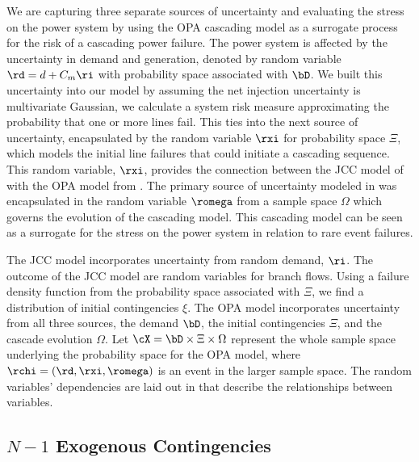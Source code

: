 We are capturing three separate sources of uncertainty and evaluating the stress on the power system by using the OPA cascading model as a surrogate process for the risk of a cascading power failure.  The power system is affected by the uncertainty in demand and generation, denoted by random variable $\rd = d + C_m \ri$ with  probability space associated with $\bD$.  We built this uncertainty into our model by assuming the net injection uncertainty is multivariate Gaussian, we calculate a system risk measure approximating the probability that one or more lines fail.  This ties into the next source of uncertainty, encapsulated by the  random variable $\rxi$ for probability space $\Xi$, which models the initial line failures that could initiate a cascading sequence.  This random variable, $\rxi$, provides the connection between the JCC model of  with the OPA model from .  The primary source of uncertainty modeled in  was encapsulated in the random variable  $\romega$ from a sample space $\Omega$ which governs the evolution of the cascading model.  This cascading model can be seen as a surrogate for the stress on the power system in relation to rare event failures.     

The JCC model incorporates uncertainty from random demand, $\ri$.  The outcome of the JCC model are random variables for branch flows.  Using a failure density function from the probability space associated with $\Xi$, we find a distribution of initial contingencies $\xi$.  The OPA model incorporates uncertainty from all three sources, the demand $\bD$, the initial contingencies $\Xi$, and the cascade evolution $\Omega$.  Let $\cX = \bD \times \Xi \times \Omega$ represent the whole sample space underlying the probability space for the OPA model, where $\rchi = (\rd, \rxi, \romega)$ is an event in the larger sample space.  The random variables' dependencies are laid out in  that describe the relationships between variables.



\subsection{$N-1$ Exogenous Contingencies}

